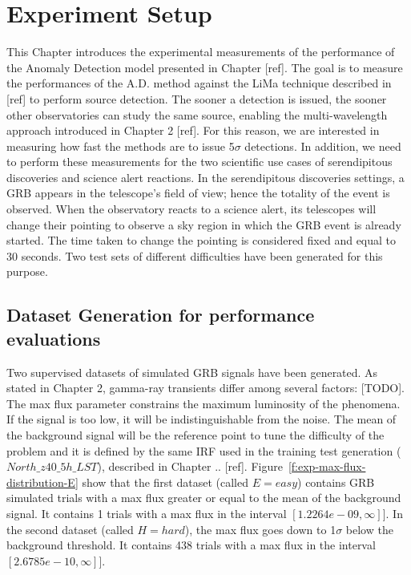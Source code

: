 \section{Experiment Setup}
\label{s:Experiment-Setup}

This Chapter introduces the experimental measurements of the performance of the Anomaly Detection model presented in Chapter [ref].
The goal is to measure the performances of the A.D. method against the LiMa technique described in [ref] to perform source detection. The sooner a detection is issued, the sooner other observatories can study the same source, enabling the multi-wavelength approach introduced in Chapter 2 [ref]. For this reason, we are interested in measuring how fast the methods are to issue 5$\sigma$ detections.
In addition, we need to perform these measurements for the two scientific use cases of serendipitous discoveries and science alert reactions. In the serendipitous discoveries settings, a GRB appears in the telescope's field of view; hence the totality of the event is observed. When the observatory reacts to a science alert, its telescopes will change their pointing to observe a sky region in which the GRB event is already started. The time taken to change the pointing is considered fixed and equal to 30 seconds. Two test sets of different difficulties have been generated for this purpose.

\subsection{Dataset Generation for performance evaluations}
\label{s:Experiment-Data}
Two supervised datasets of simulated GRB signals have been generated. As stated in Chapter 2, gamma-ray transients differ among several factors: [TODO]. The max flux parameter constrains the maximum luminosity of the phenomena. If the signal is too low, it will be indistinguishable from the noise. The mean of the background signal will be the reference point to tune the difficulty of the problem and it is defined by the same IRF used in the training test generation ($North\_z40\_5h\_LST$), described in Chapter .. [ref]. Figure~\ref{f:exp-max-flux-distribution-E} show that the first dataset (called $E=easy$) contains GRB simulated trials with a max flux greater or equal to the mean of the background signal. It contains 1 trials with a max flux in the interval $[1.2264e-09, \infty]$]. In the second dataset (called $H=hard$), the max flux goes down to 1$\sigma$ below the background threshold. It contains 438 trials with a max flux in the interval $[2.6785e-10, \infty]$].  

